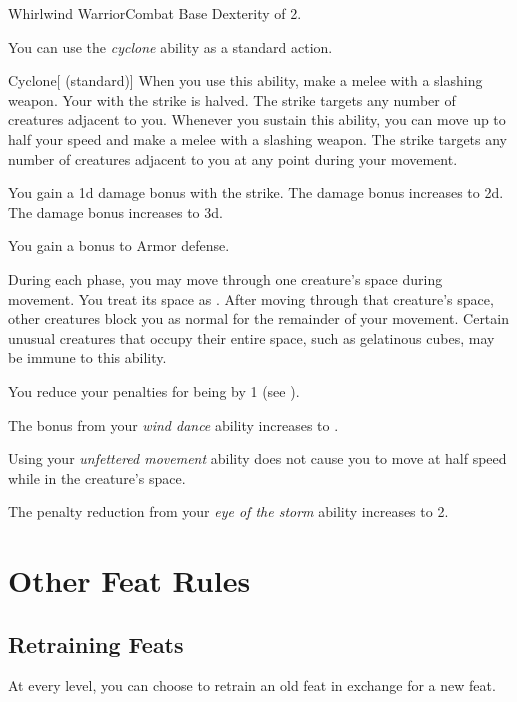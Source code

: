     \begin{feat}{Whirlwind Warrior}{Combat}
        \featpre Base Dexterity of 2.

         You can use the \textit{cyclone} ability as a standard action.
        \begin{freeability}{Cyclone}[ (standard)]
            When you use this ability, make a melee  with a slashing weapon.
            Your  with the strike is halved.
            The strike targets any number of creatures adjacent to you.
            Whenever you sustain this ability, you can move up to half your speed and make a melee  with a slashing weapon.
            The strike targets any number of creatures adjacent to you at any point during your movement.

            \rankline
             You gain a \plus1d damage bonus with the strike.
             The damage bonus increases to \plus2d.
             The damage bonus increases to \plus3d.
        \end{freeability}

         You gain a  bonus to Armor defense.

         During each phase, you may move through one creature's space during movement.
        You treat its space as .
        After moving through that creature's space, other creatures block you as normal for the remainder of your movement.
        Certain unusual creatures that occupy their entire space, such as gelatinous cubes, may be immune to this ability.

         You reduce your penalties for being \surrounded by 1 (see ).

         The bonus from your \textit{wind dance} ability increases to .

         Using your \textit{unfettered movement} ability does not cause you to move at half speed while in the creature's space.

         The penalty reduction from your \textit{eye of the storm} ability increases to 2.
    \end{feat}

\section{Other Feat Rules}

    \subsection{Retraining Feats}
        At every level, you can choose to retrain an old feat in exchange for a new feat.
